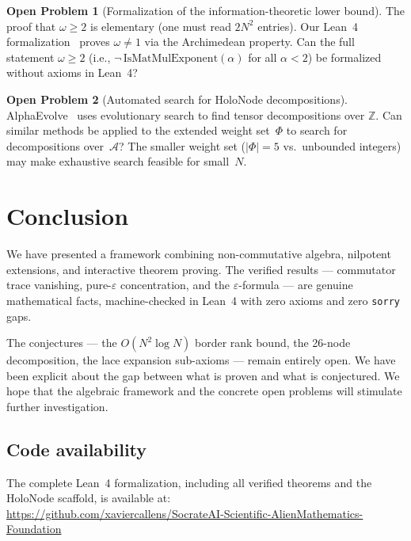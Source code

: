 \documentclass[11pt,a4paper]{article}
\theoremstyle{definition}
\newtheorem{openproblem}{Open Problem}[section]
\theoremstyle{remark}
\begin{document}
\begin{openproblem}[Formalization of the information-theoretic lower
bound]\label{op:lower-bound}
The proof that $\omega \ge 2$ is elementary (one must read $2N^2$
entries). Our Lean~4 formalization~\cite{SocrateAI2026} proves
$\omega \ne 1$ via the Archimedean property. Can the full statement
$\omega \ge 2$ (i.e., $\neg\,\mathrm{IsMatMulExponent}(\alpha)$ for
all $\alpha < 2$) be formalized without axioms in Lean~4?
\end{openproblem}

\begin{openproblem}[Automated search for HoloNode decompositions]
\label{op:search}
AlphaEvolve~\cite{AlphaEvolve2025} uses evolutionary search to find
tensor decompositions over $\mathbb{Z}$. Can similar methods be
applied to the extended weight set~$\Phi$ to search for decompositions
over~$\mathcal{A}$? The smaller weight set ($|\Phi| = 5$ vs.\
unbounded integers) may make exhaustive search feasible for
small~$N$.
\end{openproblem}

\section{Conclusion}

We have presented a framework combining non-commutative algebra,
nilpotent extensions, and interactive theorem proving. The verified
results --- commutator trace vanishing, pure-$\varepsilon$ concentration,
and the $\varepsilon$-formula --- are genuine mathematical facts,
machine-checked in Lean~4 with zero axioms and zero \texttt{sorry}
gaps.

The conjectures --- the $O(N^2 \log N)$ border rank bound, the
26-node decomposition, the lace expansion sub-axioms --- remain
entirely open. We have been explicit about the gap between what is
proven and what is conjectured. We hope that the algebraic
framework and the concrete open problems will stimulate further
investigation.

\subsection*{Code availability}
The complete Lean~4 formalization, including all verified theorems
and the HoloNode scaffold, is available at:\\
\url{https://github.com/xaviercallens/SocrateAI-Scientific-AlienMathematics-Foundation}
\end{document}
